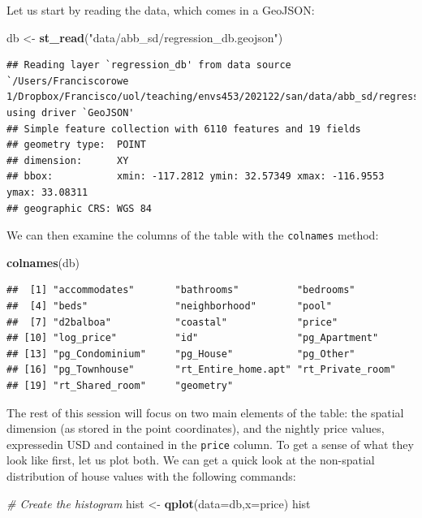 \documentclass[
]{book}
\newenvironment{Shaded}{\begin{snugshade}}{\end{snugshade}}
\newcommand{\CommentTok}[1]{\textcolor[rgb]{0.56,0.35,0.01}{\textit{#1}}}
\newcommand{\DataTypeTok}[1]{\textcolor[rgb]{0.13,0.29,0.53}{#1}}
\newcommand{\KeywordTok}[1]{\textcolor[rgb]{0.13,0.29,0.53}{\textbf{#1}}}
\newcommand{\NormalTok}[1]{#1}
\newcommand{\StringTok}[1]{\textcolor[rgb]{0.31,0.60,0.02}{#1}}
\begin{document}
Let us start by reading the data, which comes in a GeoJSON:

\begin{Shaded}
\begin{Highlighting}[]
\NormalTok{db <-}\StringTok{ }\KeywordTok{st_read}\NormalTok{(}\StringTok{"data/abb_sd/regression_db.geojson"}\NormalTok{)}
\end{Highlighting}
\end{Shaded}

\begin{verbatim}
## Reading layer `regression_db' from data source `/Users/Franciscorowe 1/Dropbox/Francisco/uol/teaching/envs453/202122/san/data/abb_sd/regression_db.geojson' using driver `GeoJSON'
## Simple feature collection with 6110 features and 19 fields
## geometry type:  POINT
## dimension:      XY
## bbox:           xmin: -117.2812 ymin: 32.57349 xmax: -116.9553 ymax: 33.08311
## geographic CRS: WGS 84
\end{verbatim}

We can then examine the columns of the table with the \texttt{colnames} method:

\begin{Shaded}
\begin{Highlighting}[]
\KeywordTok{colnames}\NormalTok{(db)}
\end{Highlighting}
\end{Shaded}

\begin{verbatim}
##  [1] "accommodates"       "bathrooms"          "bedrooms"          
##  [4] "beds"               "neighborhood"       "pool"              
##  [7] "d2balboa"           "coastal"            "price"             
## [10] "log_price"          "id"                 "pg_Apartment"      
## [13] "pg_Condominium"     "pg_House"           "pg_Other"          
## [16] "pg_Townhouse"       "rt_Entire_home.apt" "rt_Private_room"   
## [19] "rt_Shared_room"     "geometry"
\end{verbatim}

The rest of this session will focus on two main elements of the table: the spatial dimension (as stored in the point coordinates), and the nightly price values, expressedin USD and contained in the \texttt{price} column. To get a sense of what they look like first, let us plot both. We can get a quick look at the non-spatial distribution of house values with the following commands:

\begin{Shaded}
\begin{Highlighting}[]
\CommentTok{# Create the histogram}
\NormalTok{hist <-}\StringTok{ }\KeywordTok{qplot}\NormalTok{(}\DataTypeTok{data=}\NormalTok{db,}\DataTypeTok{x=}\NormalTok{price)}
\NormalTok{hist}
\end{Highlighting}
\end{Shaded}
\end{document}

